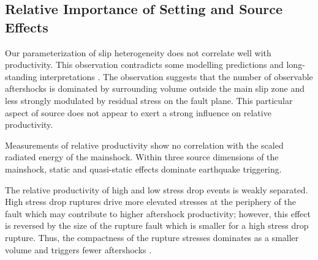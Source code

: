 \documentclass[draft, jgrga]{agujournal2018}
\begin{document}
\subsection{Relative Importance of Setting and Source Effects}

Our parameterization of slip heterogeneity does not correlate well with productivity. This observation contradicts some modelling predictions \citep{Helmstetter2006RelationModel, Marsan2006} and long-standing interpretations \citep[e.g.][]{Mogi1967}. The observation suggests that the number of observable aftershocks is dominated by surrounding volume outside the main slip zone and less strongly modulated by residual stress on the fault plane. This particular aspect of source does not appear to exert a strong influence on relative productivity.
    
Measurements of relative productivity show no correlation with the scaled radiated energy of the mainshock. Within three source dimensions of the mainshock, static and quasi-static effects dominate earthquake triggering. 

The relative productivity of high and low stress drop events is weakly separated. High stress drop ruptures drive more elevated stresses at the periphery of the fault which may contribute to higher aftershock productivity; however, this effect is reversed by the size of the rupture fault which is smaller for a high stress drop rupture. Thus, the compactness of the rupture stresses dominates as a smaller volume and triggers fewer aftershocks \citep{Wetzler2016}.

\end{document}
